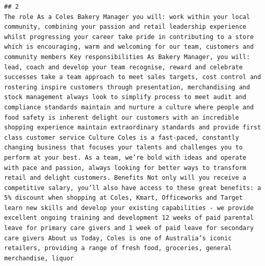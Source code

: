 \documentclass[11pt,a4paper,]{article}
\begin{document}
\begin{verbatim}
## 2                                                                                                                                                                                                                                                                                                                                                                                                                                                                                                                                                                                                                                                                                                                                                                                                                                                                                                                                                                                                                                                                                                                                                                                                                                                                                                                                                                                                                                                                                                                                                                                                                                                                                                                                         The role As a Coles Bakery Manager you will: work within your local community, combining your passion and retail leadership experience whilst progressing your career take pride in contributing to a store which is encouraging, warm and welcoming for our team, customers and community members Key responsibilities As Bakery Manager, you will: lead, coach and develop your team recognise, reward and celebrate successes take a team approach to meet sales targets, cost control and rostering inspire customers through presentation, merchandising and stock management always look to simplify process to meet audit and compliance standards maintain and nurture a culture where people and food safety is inherent delight our customers with an incredible shopping experience maintain extraordinary standards and provide first class customer service Culture Coles is a fast-paced, constantly changing business that focuses your talents and challenges you to perform at your best. As a team, we’re bold with ideas and operate with pace and passion, always looking for better ways to transform retail and delight customers. Benefits Not only will you receive a competitive salary, you’ll also have access to these great benefits: a 5% discount when shopping at Coles, Kmart, Officeworks and Target learn new skills and develop your existing capabilities - we provide excellent ongoing training and development 12 weeks of paid parental leave for primary care givers and 1 week of paid leave for secondary care givers About us Today, Coles is one of Australia’s iconic retailers, providing a range of fresh food, groceries, general merchandise, liquor 
\end{verbatim}
\end{document}
